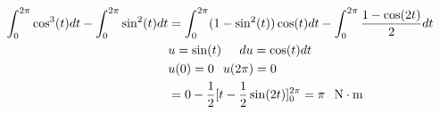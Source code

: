 \documentclass{article}
\begin{document}
\begin{itemize}
        \begin{align*}
            \int_0^{2\pi} \cos^{3}(t)dt - \int_0^{2\pi} \sin^{2}(t)dt &= \int_0^{2\pi} (1-\sin^{2}(t))\cos(t)dt - \int_0^{2\pi}\frac{1-\cos(2t)}{2}dt \\
            &u = \sin(t) \hspace{0.2in} du = \cos(t)dt \\
            &u(0) = 0 \hspace{0.1in} u(2\pi) = 0\\
            &= 0 - \frac{1}{2}[t-\frac{1}{2}\sin(2t)]_0^{2\pi} = \pi \hspace{0.1in} \mathrm{N\cdot m}
        \end{align*}
    \end{itemize}

    \newpage
\end{document}
